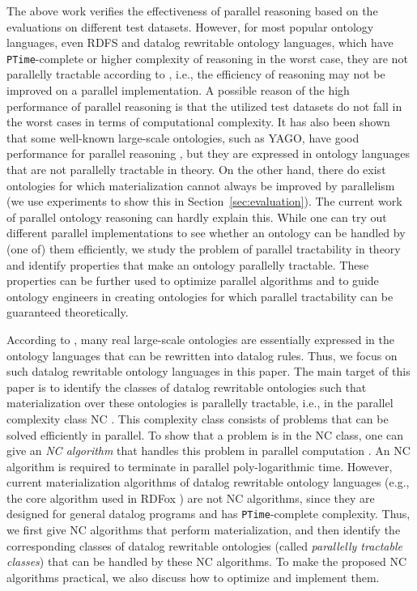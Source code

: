 \documentclass[final,1p,times]{elsarticle}
\begin{document}
The above work verifies the effectiveness of parallel reasoning based on the evaluations on different test datasets.
However, for most popular ontology languages, even RDFS and datalog rewritable ontology languages,
which have \texttt{PTime}-complete or higher complexity of reasoning in the worst case,
they are not parallelly tractable according to \cite{Raymond95}, i.e., the efficiency of reasoning may not be
improved on a parallel implementation. A possible reason of the high performance of parallel
reasoning is that the utilized test datasets do not fall in the worst cases in terms of computational complexity.
It has also been shown that some well-known large-scale ontologies, such as YAGO, have good performance for parallel
reasoning \cite{KolovskiWE10}, but they are expressed in ontology languages that are not parallelly tractable in theory.
On the other hand, there do exist ontologies for which materialization cannot
always be improved by parallelism (we use experiments to show this in Section~\ref{sec:evaluation}).
The current work of parallel ontology reasoning can hardly explain this.
While one can try out different parallel implementations to see whether an ontology can be handled by (one of) them efficiently,
we study the problem of parallel tractability in theory and identify properties that make an ontology parallelly tractable.
These properties can be further used to optimize parallel algorithms and to guide ontology engineers in creating ontologies
for which parallel tractability can be guaranteed theoretically.

According to \cite{MotikNPHO14}, many real large-scale ontologies are essentially expressed in the ontology languages
that can be rewritten into datalog rules. Thus, we focus on such datalog rewritable ontology languages in this paper.
The main target of this paper is to identify the classes of datalog rewritable ontologies such that materialization
over these ontologies is parallelly tractable, i.e., in the parallel complexity class NC \cite{Raymond95}.
This complexity class consists of problems that can be solved efficiently in parallel.
To show that a problem is in the NC class, one can give an \emph{NC algorithm} that handles this problem
in parallel computation \cite{Raymond95}.
An NC algorithm is required to terminate in parallel poly-logarithmic time.
However, current materialization algorithms of datalog rewritable ontology languages
(e.g., the core algorithm used in RDFox \cite{MotikNPHO14}) are not NC algorithms,
since they are designed for general datalog programs and has \texttt{PTime}-complete complexity.
Thus, we first give NC algorithms that perform materialization,
and then identify the corresponding classes of datalog rewritable ontologies (called \emph{parallelly tractable classes})
that can be handled by these NC algorithms. To make the proposed NC algorithms practical,
we also discuss how to optimize and implement them.
\end{document}
